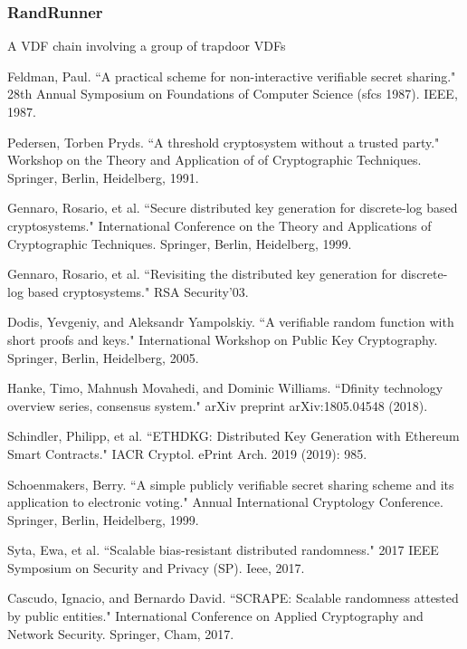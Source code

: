 \documentclass[11pt]{article}
\theoremstyle{definition}
\theoremstyle{remark}
\begin{document}
\subsubsection{RandRunner}
A VDF chain involving a group of trapdoor VDFs

\newpage
\begin{thebibliography}{100}
Feldman, Paul. ``A practical scheme for non-interactive verifiable secret sharing." 28th Annual Symposium on Foundations of Computer Science (sfcs 1987). IEEE, 1987.

Pedersen, Torben Pryds. ``A threshold cryptosystem without a trusted party." Workshop on the Theory and Application of of Cryptographic Techniques. Springer, Berlin, Heidelberg, 1991.

Gennaro, Rosario, et al. ``Secure distributed key generation for discrete-log based cryptosystems." International Conference on the Theory and Applications of Cryptographic Techniques. Springer, Berlin, Heidelberg, 1999.

Gennaro, Rosario, et al. ``Revisiting the distributed key generation for discrete-log based cryptosystems." RSA Security'03.

Dodis, Yevgeniy, and Aleksandr Yampolskiy. ``A verifiable random function with short proofs and keys." International Workshop on Public Key Cryptography. Springer, Berlin, Heidelberg, 2005.

Hanke, Timo, Mahnush Movahedi, and Dominic Williams. ``Dfinity technology overview series, consensus system." arXiv preprint arXiv:1805.04548 (2018).

Schindler, Philipp, et al. ``ETHDKG: Distributed Key Generation with Ethereum Smart Contracts." IACR Cryptol. ePrint Arch. 2019 (2019): 985.

Schoenmakers, Berry. ``A simple publicly verifiable secret sharing scheme and its application to electronic voting." Annual International Cryptology Conference. Springer, Berlin, Heidelberg, 1999.

Syta, Ewa, et al. ``Scalable bias-resistant distributed randomness." 2017 IEEE Symposium on Security and Privacy (SP). Ieee, 2017.

Cascudo, Ignacio, and Bernardo David. ``SCRAPE: Scalable randomness attested by public entities." International Conference on Applied Cryptography and Network Security. Springer, Cham, 2017.


\end{thebibliography}
\end{document}
